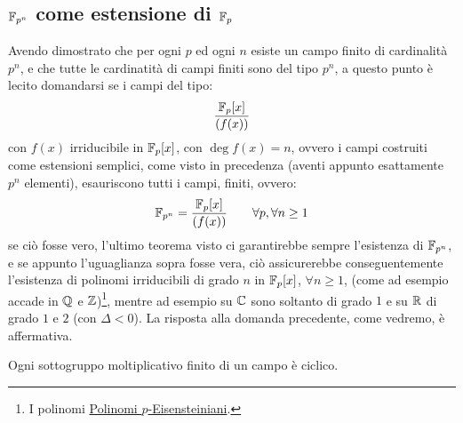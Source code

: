 \documentclass[11pt]{scrartcl}
\begin{document}
\subsection{$\mathbb{F}_{p^{n}}$ come estensione di ${\mathbb F}_p$}
Avendo dimostrato che per ogni $p$ ed ogni $n$ esiste un campo finito di cardinalità $p^n$, e che tutte le cardinatità di campi finiti sono del tipo $p^n$, a questo punto è 
lecito domandarsi se i campi del tipo:
	\[ \frac{{\mathbb F}_p[x]}{(f(x))}
		\]
con $f(x)$ irriducibile in ${\mathbb F}_p[x]$, con $\deg f(x) = n$, ovvero i campi costruiti come estensioni semplici, come visto in precedenza (aventi appunto esattamente $p^n$ elementi), esauriscono tutti i campi,
finiti, ovvero:
	\[ \mathbb{F}_{p^{n}} = \frac{{\mathbb F}_p[x]}{(f(x))} \qquad \forall p,\forall n \geq 1
	\]
se ciò fosse vero, l'ultimo teorema visto ci garantirebbe sempre l'esistenza di $\mathbb{F}_{p^{n}}$, e se appunto l'uguaglianza sopra fosse vera, ciò assicurerebbe conseguentemente l'esistenza di
 polinomi irriducibili di grado $n$ in ${\mathbb F}_p[x]$, $\forall n \geq 1$, (come ad esempio accade in $\mathbb Q$ e $\mathbb Z$)\footnote{I polinomi \hyperref[p:pE]{Polinomi $p$-Eisensteiniani}.},
  mentre ad esempio su $\mathbb C$ sono soltanto di grado $1$ e su $\mathbb R$  di grado $1$ e $2$  (con $\Delta<0$).
La risposta alla domanda precedente, come vedremo, è affermativa.


\begin{theorem}
	\label{cf:5.11}
	Ogni sottogruppo moltiplicativo finito di un campo è ciclico.
\end{theorem}
\end{document}
